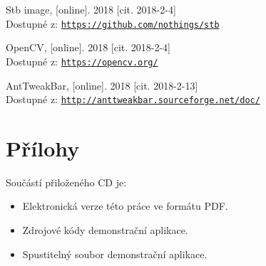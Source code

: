 \documentclass[czech,public,dept460,male,cpdeclaration]{diploma}
\begin{document}
\begin{thebibliography}{99}
	 Stb image,
		[online]. 2018 [cit. 2018-2-4]\\
		Dostupné z: \href{https://github.com/nothings/stb}{\texttt{https://github.com/nothings/stb}}
		
	 OpenCV,
		[online]. 2018 [cit. 2018-2-4]\\
		Dostupné z: \href{https://opencv.org/}{\texttt{https://opencv.org/}}
		
	 AntTweakBar,
		[online]. 2018 [cit. 2018-2-13]\\
		Dostupné z: \href{http://anttweakbar.sourceforge.net/doc/}{\texttt{http://anttweakbar.sourceforge.net/doc/}}
		
\end{thebibliography}


\appendix
\section{Přílohy}

Součástí přiloženého CD je:

\begin{itemize}
	\item Elektronická verze této práce ve formátu PDF.
	\item Zdrojové kódy demonstrační aplikace.
	\item Spustitelný soubor demonstrační aplikace.
\end{itemize}
\end{document}
